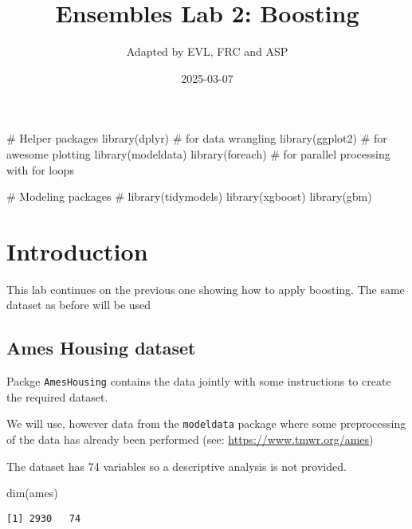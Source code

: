 \documentclass[
  letterpaper,
  DIV=11,
  numbers=noendperiod,
  oneside]{scrartcl}
\title{Ensembles Lab 2: Boosting}
\author{Adapted by EVL, FRC and ASP}
\date{2025-03-07}
\newenvironment{Shaded}{\begin{snugshade}}{\end{snugshade}}
\newcommand{\CommentTok}[1]{\textcolor[rgb]{0.37,0.37,0.37}{#1}}
\newcommand{\FunctionTok}[1]{\textcolor[rgb]{0.28,0.35,0.67}{#1}}
\newcommand{\NormalTok}[1]{\textcolor[rgb]{0.00,0.23,0.31}{#1}}
\begin{document}
\maketitle


\begin{Shaded}
\begin{Highlighting}[]
\CommentTok{\# Helper packages}
\FunctionTok{library}\NormalTok{(dplyr)       }\CommentTok{\# for data wrangling}
\FunctionTok{library}\NormalTok{(ggplot2)     }\CommentTok{\# for awesome plotting}
\FunctionTok{library}\NormalTok{(modeldata)  }
\FunctionTok{library}\NormalTok{(foreach)     }\CommentTok{\# for parallel processing with for loops}

\CommentTok{\# Modeling packages}
\CommentTok{\# library(tidymodels)}
\FunctionTok{library}\NormalTok{(xgboost)}
\FunctionTok{library}\NormalTok{(gbm)}
\end{Highlighting}
\end{Shaded}

\section{Introduction}\label{introduction}

This lab continues on the previous one showing how to apply boosting.
The same dataset as before will be used

\subsection{Ames Housing dataset}\label{ames-housing-dataset}

Packge \texttt{AmesHousing} contains the data jointly with some
instructions to create the required dataset.

We will use, however data from the \texttt{modeldata} package where some
preprocessing of the data has already been performed (see:
\url{https://www.tmwr.org/ames})

The dataset has 74 variables so a descriptive analysis is not provided.

\begin{Shaded}
\begin{Highlighting}[]
\FunctionTok{dim}\NormalTok{(ames)}
\end{Highlighting}
\end{Shaded}

\begin{verbatim}
[1] 2930   74
\end{verbatim}
\end{document}
